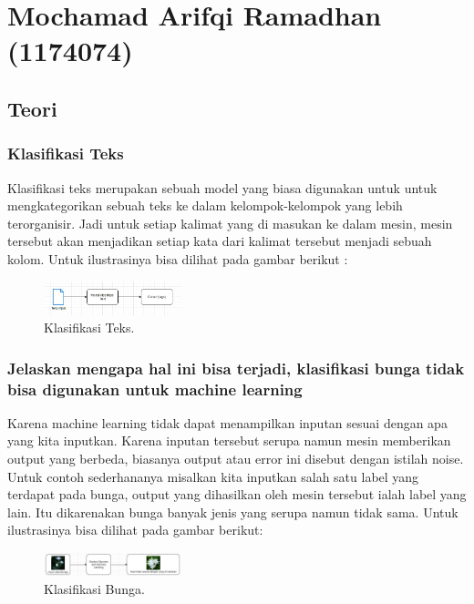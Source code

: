 \section{Mochamad Arifqi Ramadhan (1174074)}
\subsection{Teori}
\subsubsection{Klasifikasi Teks}
\hfill\break
Klasifikasi teks merupakan sebuah model yang biasa digunakan untuk untuk mengkategorikan sebuah teks ke dalam kelompok-kelompok yang lebih terorganisir. Jadi untuk setiap kalimat yang di masukan ke dalam mesin, mesin tersebut akan menjadikan setiap kata dari kalimat tersebut menjadi sebuah kolom. Untuk ilustrasinya bisa dilihat pada gambar berikut : 

\begin{figure}[H]
\centering
\includegraphics[width=4cm]{figures/1174074/4/1.jpg}
\caption{Klasifikasi Teks.}
\end{figure}

\subsubsection{Jelaskan mengapa hal ini bisa terjadi, klasifikasi bunga tidak bisa digunakan untuk machine learning}
\hfill\break
Karena machine learning tidak dapat menampilkan inputan sesuai dengan apa yang kita inputkan. Karena inputan tersebut serupa namun mesin memberikan output yang berbeda, biasanya output atau error ini disebut dengan istilah noise. Untuk contoh sederhananya misalkan kita inputkan salah satu label yang terdapat pada bunga, output yang dihasilkan oleh mesin tersebut ialah label yang lain. Itu dikarenakan bunga banyak jenis yang serupa namun tidak sama. Untuk ilustrasinya bisa dilihat pada gambar berikut: 

\begin{figure}[H]
\centering
\includegraphics[width=4cm]{figures/1174074/4/2.jpg}
\caption{Klasifikasi Bunga.}
\end{figure}

